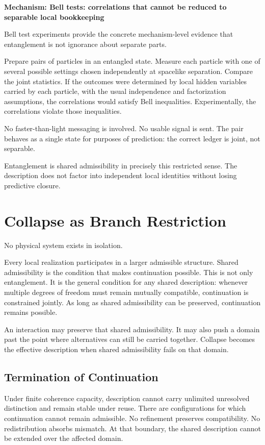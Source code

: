 \documentclass[11pt,twoside,openright]{book}
\newenvironment{mechanismbox}[1]
  {\begin{framed}\noindent\textbf{Mechanism: #1}\par\medskip}
  {\end{framed}}
\begin{document}
\begin{mechanismbox}{Bell tests: correlations that cannot be reduced to separable local bookkeeping}
Bell test experiments provide the concrete mechanism-level evidence that entanglement is not ignorance about separate parts.

Prepare pairs of particles in an entangled state. Measure each particle with one of several possible settings chosen independently at spacelike separation. Compare the joint statistics. If the outcomes were determined by local hidden variables carried by each particle, with the usual independence and factorization assumptions, the correlations would satisfy Bell inequalities. Experimentally, the correlations violate those inequalities.

No faster-than-light messaging is involved. No usable signal is sent. The pair behaves as a single state for purposes of prediction: the correct ledger is joint, not separable.

Entanglement is shared admissibility in precisely this restricted sense.
The description does not factor into independent local identities without losing predictive closure.
\end{mechanismbox}

\chapter{Collapse as Branch Restriction}

No physical system exists in isolation.

Every local realization participates in a larger admissible structure. Shared admissibility is the condition that makes continuation possible. This is not only entanglement. It is the general condition for any shared description: whenever multiple degrees of freedom must remain mutually compatible, continuation is constrained jointly. As long as shared admissibility can be preserved, continuation remains possible.

An interaction may preserve that shared admissibility. It may also push a domain past the point where alternatives can still be carried together. Collapse becomes the effective description when shared admissibility fails on that domain.

\section*{Termination of Continuation}

Under finite coherence capacity, description cannot carry unlimited unresolved distinction and remain stable under reuse. There are configurations for which continuation cannot remain admissible. No refinement preserves compatibility. No redistribution absorbs mismatch. At that boundary, the shared description cannot be extended over the affected domain.
\end{document}

